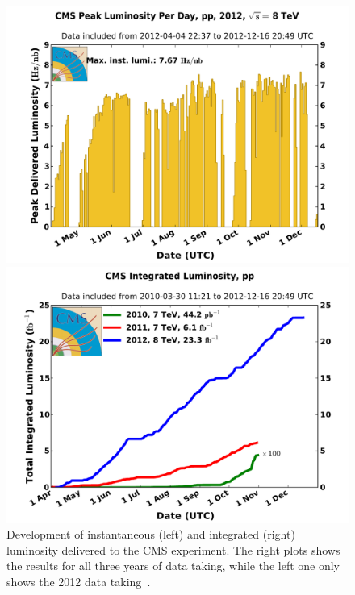 \begin{figure}[htbp]
\centering
\begin{minipage}[t]{0.49\textwidth}
  \includegraphics[width=\textwidth]{plots/LHC/peak_lumi_per_day_pp_2012.pdf}
\end{minipage}
\begin{minipage}[t]{0.49\textwidth}
\includegraphics[width=\textwidth]{plots/LHC/int_lumi_cumulative_pp_2.pdf}
\end{minipage}
\caption{Development of instantaneous (left) and integrated (right) luminosity delivered to the CMS experiment. The right plots shows the results for all three years of data taking, while the left one only shows the 2012 data taking~\cite{LumiTwiki}.}
\label{fig:lumiOverview}
\end{figure}